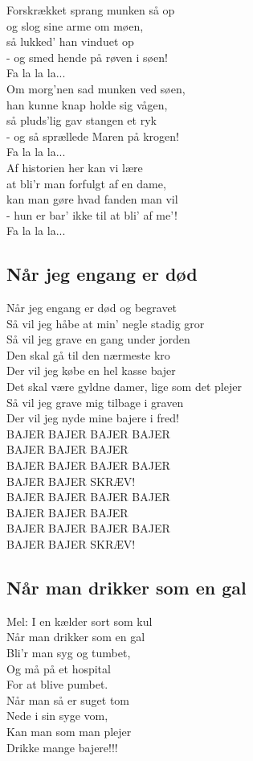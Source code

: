 Forskrækket sprang munken så op\\
og slog sine arme om møen,\\
så lukked' han vinduet op\\
- og smed hende på røven i søen!\\
Fa la la la...\\
 
Om morg'nen sad munken ved søen,\\
han kunne knap holde sig vågen,\\
så pluds'lig gav stangen et ryk\\
- og så sprællede Maren på krogen!\\
Fa la la la...\\
 
Af historien her kan vi lære\\
at bli'r man forfulgt af en dame,\\
kan man gøre hvad fanden man vil\\
- hun er bar' ikke til at bli' af me'!\\
Fa la la la...\\

\subsection*{Når jeg engang er død}

Når jeg engang er død og begravet\\
Så vil jeg håbe at min’ negle stadig gror\\

Så vil jeg grave en gang under jorden\\
Den skal gå til den nærmeste kro\\

Der vil jeg købe en hel kasse bajer\\
Det skal være gyldne damer, lige som det plejer\\

Så vil jeg grave mig tilbage i graven\\
Der vil jeg nyde mine bajere i fred!\\

BAJER BAJER BAJER BAJER\\
BAJER BAJER BAJER\\
BAJER BAJER BAJER BAJER\\
BAJER BAJER SKRÆV!\\

BAJER BAJER BAJER BAJER\\
BAJER BAJER BAJER\\
BAJER BAJER BAJER BAJER\\
BAJER BAJER SKRÆV!\\

\subsection*{Når man drikker som en gal}

Mel: I en kælder sort som kul\\

Når man drikker som en gal\\
Bli'r man syg og tumbet,\\
Og må på et hospital\\
For at blive pumbet.\\
Når man så er suget tom\\ 
Nede i sin syge vom,\\
Kan man som man plejer\\ 
Drikke mange bajere!!!\\
